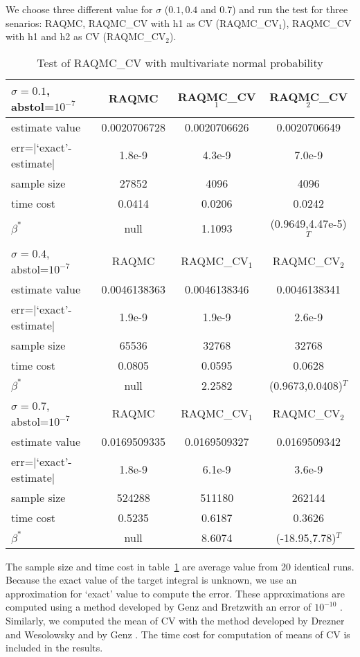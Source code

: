 We choose three different value for $\sigma$ ($0.1, 0.4$ and $0.7$) and run the test for three senarios: RAQMC, RAQMC\_CV with h1 as CV (RAQMC\_CV$_1$), RAQMC\_CV with h1 and h2 as CV (RAQMC\_CV$_2$). 
\begin{table}[h]
    \centering
	\caption{Test of RAQMC\_CV with multivariate normal probability}
    \label{tb:mvntest}
    \begin{tabular}{lccc}  
    \hline \hline
    $\sigma=0.1$, abstol=$10^{-7}$ &RAQMC&RAQMC\_CV$_1$&RAQMC\_CV$_2$\\[0.5ex]
    \hline
    estimate value& 0.0020706728& 0.0020706626&0.0020706649\\[0.5ex]
    err=$|$`exact'-estimate$|$ & 1.8e-9&4.3e-9&7.0e-9\\[0.5ex]
    sample size& 27852& 4096&4096\\[0.5ex]
    time cost& 0.0414& 0.0206&0.0242\\[0.5ex]
    $\beta^*$& null&1.1093 & (0.9649,4.47e-5)$^T$\\[0.5ex]
    \hline
    $\sigma=0.4$, abstol=$10^{-7}$ &RAQMC&RAQMC\_CV$_1$&RAQMC\_CV$_2$\\[0.5ex]
    \hline
    estimate value& 0.0046138363& 0.0046138346&0.0046138341\\[0.5ex]
    err=$|$`exact'-estimate$|$ & 1.9e-9& 1.9e-9&2.6e-9\\[0.5ex]
    sample size& 65536& 32768&32768\\[0.5ex]
    time cost& 0.0805&0.0595&0.0628\\[0.5ex]
    $\beta^*$& null&2.2582 & (0.9673,0.0408)$^T$\\[0.5ex]
    \hline
    $\sigma=0.7$, abstol=$10^{-7}$& RAQMC&RAQMC\_CV$_1$&RAQMC\_CV$_2$\\[0.5ex]
    \hline
    estimate value&0.0169509335 & 0.0169509327&0.0169509342\\[0.5ex]
    err=$|$`exact'-estimate$|$ & 1.8e-9& 6.1e-9&3.6e-9\\[0.5ex]
    sample size& 524288& 511180&262144\\[0.5ex]
    time cost& 0.5235& 0.6187&0.3626\\[0.5ex]
    $\beta^*$& null&8.6074 &(-18.95,7.78)$^T$\\[0.5ex]
    \hline
    \end{tabular}
\end{table}
The sample size and time cost in table~\ref{tb:mvntest} are average value from 20 identical runs. 
Because the exact value of the target integral is unknown, we use an approximation for `exact' value to compute the error. 
These approximations are computed using a method developed by Genz and Bretzwith an error of $10^{-10}$ \cite{genz1992numerical}. 
Similarly, we computed the mean of CV with the method developed by Drezner and Wesolowsky and by Genz \cite{drezner1978computation}\cite{genz2004numerical}. The time cost for computation of means of CV is included in the results.  

